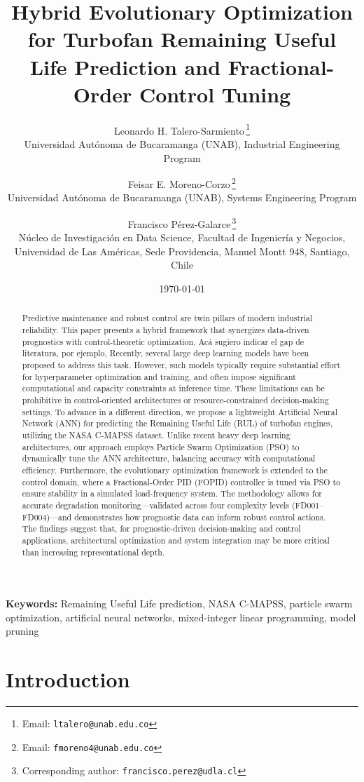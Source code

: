 \documentclass[12pt, a4paper]{article}
\title{Hybrid Evolutionary Optimization for Turbofan Remaining Useful Life Prediction and Fractional-Order Control Tuning}
\author{
Leonardo H. Talero-Sarmiento\,\orcidlink{0000-0002-4129-9163}\thanks{Email: \texttt{ltalero@unab.edu.co}} \\
\small Universidad Autónoma de Bucaramanga (UNAB), Industrial Engineering Program
\and
Feisar E. Moreno-Corzo\,\orcidlink{0000-0002-5007-3422}\thanks{Email: \texttt{fmoreno4@unab.edu.co}} \\
\small Universidad Autónoma de Bucaramanga (UNAB), Systems Engineering Program
\and
Francisco Pérez-Galarce\,\orcidlink{0000-0002-6921-298X}\thanks{Corresponding author: \texttt{francisco.perez@udla.cl}} \\
\small Núcleo de Investigación en Data Science, Facultad de Ingeniería y Negocios, \\
\small Universidad de Las Américas, Sede Providencia, Manuel Montt 948, Santiago, Chile
}
\date{\today}
\begin{document}
\maketitle

\begin{abstract}
Predictive maintenance and robust control are twin pillars of modern industrial reliability. This paper presents a hybrid framework that synergizes data-driven prognostics with control-theoretic optimization. \color{red} Acá sugiero indicar el gap de literatura, por ejemplo, Recently, several large deep learning models have been proposed to address this task. However, such models typically require substantial effort for hyperparameter optimization and training, and often impose significant computational and capacity constraints at inference time. These limitations can be prohibitive in control-oriented architectures or resource-constrained decision-making settings.  To advance in a different direction, \color{black} we propose a lightweight Artificial Neural Network (ANN) for predicting the Remaining Useful Life (RUL) of turbofan engines, utilizing the NASA C-MAPSS dataset. Unlike recent heavy deep learning architectures, our approach employs Particle Swarm Optimization (PSO) to dynamically tune the ANN architecture, balancing accuracy with computational efficiency. Furthermore, the evolutionary optimization framework is extended to the control domain, where a Fractional-Order PID (FOPID) controller is tuned via PSO to ensure stability in a simulated load-frequency system. The methodology allows for accurate degradation monitoring—validated across four complexity levels (FD001--FD004)—and demonstrates how prognostic data can inform robust control actions. The findings suggest that, for prognostic-driven decision-making and control applications, architectural optimization and system integration may be more critical than increasing representational depth.
\end{abstract}
\noindent\textbf{Keywords:} Remaining Useful Life prediction, NASA C-MAPSS, particle swarm optimization, artificial neural networks, mixed-integer linear programming, model pruning

\section{Introduction}
\end{document}
